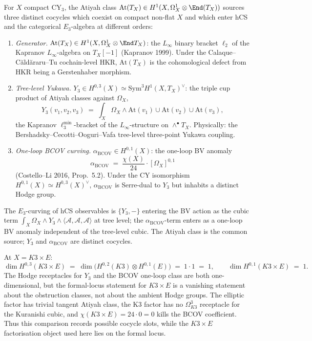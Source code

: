 \begin{theorem}
\label{thm:atiyah-three-cocycles-treatise}
For $X$ compact CY$_3$, the Atiyah class $\mathrm{At}(T_X) \in H^1(X, \Omega^1_X \otimes \End(T_X))$ sources three distinct cocycles which coexist on compact non-flat $X$ and which enter hCS and the categorical $E_3$-algebra at different orders:
\begin{enumerate}
\item \emph{Generator.} $\mathrm{At}(T_X) \in H^1(X, \Omega^1_X \otimes \End T_X)$: the $L_\infty$ binary bracket $\ell_2$ of the Kapranov $L_\infty$-algebra on $T_X[-1]$ (Kapranov 1999). Under the Calaque--C\u ald\u araru--Tu cochain-level HKR, $\mathrm{At}(T_X)$ is the cohomological defect from HKR being a Gerstenhaber morphism.
\item \emph{Tree-level Yukawa.} $Y_3 \in H^{0,3}(X) \simeq \mathrm{Sym}^3 H^1(X, T_X)^\vee$: the triple cup product of Atiyah classes against $\Omega_X$,
\[
Y_3(v_1, v_2, v_3) \;=\; \int_X \Omega_X \wedge \mathrm{At}(v_1) \cup \mathrm{At}(v_2) \cup \mathrm{At}(v_3),
\]
the Kapranov $\ell_3^{\min}$-bracket of the $L_\infty$-structure on $\wedge^\bullet T_X$. Physically: the Bershadsky--Cecotti--Ooguri--Vafa tree-level three-point Yukawa coupling.
\item \emph{One-loop BCOV curving.} $\alpha_{\mathrm{BCOV}} \in H^{0,1}(X)$: the one-loop BV anomaly
\[
\alpha_{\mathrm{BCOV}} \;=\; \frac{\chi(X)}{24} \cdot [\Omega_X]^{0,1}
\]
(Costello--Li 2016, Prop.~5.2). Under the CY isomorphism $H^{0,1}(X) \simeq H^{0,3}(X)^\vee$, $\alpha_{\mathrm{BCOV}}$ is Serre-dual to $Y_3$ but inhabits a distinct Hodge group.
\end{enumerate}
The $E_3$-curving of hCS observables is $\{Y_3, -\}$ entering the BV action as the cubic term $\int_X \Omega_X \wedge Y_3 \wedge \langle \mathcal{A}, \mathcal{A}, \mathcal{A} \rangle$ at tree level; the $\alpha_{\mathrm{BCOV}}$-term enters as a one-loop BV anomaly independent of the tree-level cubic. The Atiyah class is the common source; $Y_3$ and $\alpha_{\mathrm{BCOV}}$ are distinct cocycles.
\end{theorem}

\begin{remark}[Cocycle slots at $X = K3 \times E$]
\label{rem:three-cocycles-K3xE-treatise}
At $X = K3 \times E$:
\[
 \dim H^{0,3}(K3 \times E) \;=\; \dim\!\big(H^{0,2}(K3) \otimes H^{0,1}(E)\big) \;=\; 1 \cdot 1 \;=\; 1,
 \qquad
 \dim H^{0,1}(K3 \times E) \;=\; 1.
\]
The Hodge receptacles for $Y_3$ and the BCOV one-loop class are both
one-dimensional, but the formal-locus statement for $K3\times E$ is a
vanishing statement about the obstruction classes, not about the ambient
Hodge groups.  The elliptic factor has trivial tangent Atiyah class, the
K3 factor has no $\Omega^3_{K3}$ receptacle for the Kuranishi cubic, and
$\chi(K3\times E)=24\cdot0=0$ kills the BCOV coefficient.  Thus this
comparison records possible cocycle slots, while the $K3\times E$
factorisation object used here lies on the formal locus.
\end{remark}

